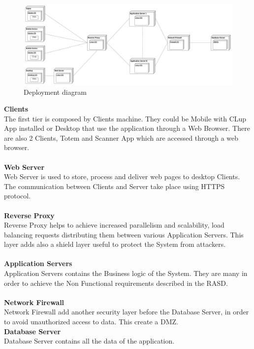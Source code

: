 \documentclass[a4paper, 12pt, oneside, table]{article}
\begin{document}
\begin{figure}[h!]
\centering
    \centering
    \includegraphics[height=0.6\textheight, width=1.1\linewidth, keepaspectratio]{img/deployment_diagram_complete.png}
    \caption{Deployment diagram}
    \label{deployment_diagram_complete}
\end{figure}

\textbf{Clients}\\
The first tier is composed by Clients machine. They could be Mobile with CLup App installed or Desktop that use the application through a Web Browser. There are also 2 Clients, Totem and Scanner App which are accessed through a web browser.\\
\\
\textbf{Web Server}\\
Web Server is used to store, process and deliver web pages to desktop Clients.
The communication between Clients and Server take place using HTTPS protocol.\\
\\
\textbf{Reverse Proxy}\\
Reverse Proxy helps to achieve increased parallelism and scalability, load balancing requests distributing them between various Application Servers. This layer adds also a shield layer useful to protect the System from attackers.\\
\\
\textbf{Application Servers}\\
Application Servers contains the Business logic of the System. They are many in order to achieve the Non Functional requirements described in the RASD.\\
\\
\textbf{Network Firewall}\\
Network Firewall add another security layer before the Database Server, in order to avoid unauthorized access to data. This create a DMZ.\\
\textbf{Database Server}\\
Database Server contains all the data of the application.
\end{document}
